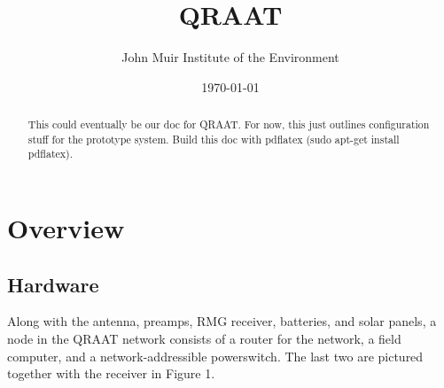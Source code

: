 \documentclass[letter]{article}
\author{John Muir Institute of the Environment}
\date{\today}
\title{QRAAT}
\begin{document}
\maketitle

\begin{abstract}
This could eventually be our doc for QRAAT. For now, this just outlines configuration 
stuff for the prototype system. Build this doc with pdflatex (sudo apt-get install pdflatex). 
\end{abstract}

\tableofcontents
\pagebreak

\section{Overview} 
\subsection{Hardware}

Along with the antenna, preamps, RMG receiver, batteries, and solar panels, a node 
in the QRAAT network consists of a router for the network, a field computer, and a network-addressible 
powerswitch. The last two are pictured together with the receiver in Figure 1. 
\end{document}
